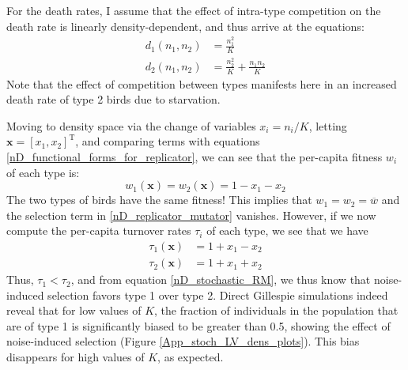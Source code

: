 For the death rates, I assume that the effect of intra-type competition on the death rate is linearly density-dependent, and thus arrive at the equations:
\begin{equation}
\label{App_example_stoch_LV_death_rates}
\begin{aligned}
	d_{1}({n_1},{n_2}) &= \frac{{n_1^2}}{K}\\
	d_{2}({n_1},{n_2}) &= \frac{{n_2^2}}{K} + \frac{{n_1}{n_2}}{K}
\end{aligned}
\end{equation}
Note that the effect of competition between types manifests here in an increased death rate of type 2 birds due to starvation.

Moving to density space via the change of variables $x_i = n_i/K$, letting $\mathbf{x} = [x_1, x_2]^{\mathrm{T}}$, and comparing terms with equations \eqref{nD_functional_forms_for_replicator}, we can see that the per-capita fitness $w_i$ of each type is:
\begin{equation*}
	w_{1}(\mathbf{x}) = w_{2}(\mathbf{x}) = 1 - x_1 - x_2
\end{equation*}
The two types of birds have the same fitness! This implies that $w_1 = w_2 = \overline{w}$ and the selection term in \eqref{nD_replicator_mutator} vanishes.
However, if we now compute the per-capita turnover rates $\tau_i$  of each type, we see that we have
\begin{align*}
	\tau_{1}(\mathbf{x}) &= 1 + x_1 - x_2\\
	\tau_{2}(\mathbf{x}) &= 1 + x_1 + x_2
\end{align*}
Thus, $\tau_{1} < \tau_{2}$, and from equation \eqref{nD_stochastic_RM}, we thus know that noise-induced selection favors type 1 over type 2.
Direct Gillespie simulations indeed reveal that for low values of $K$, the fraction of individuals in the population that are of type 1 is significantly biased to be greater than 0.5, showing the effect of noise-induced selection (Figure \ref{App_stoch_LV_dens_plots}). This bias disappears for high values of $K$, as expected.

